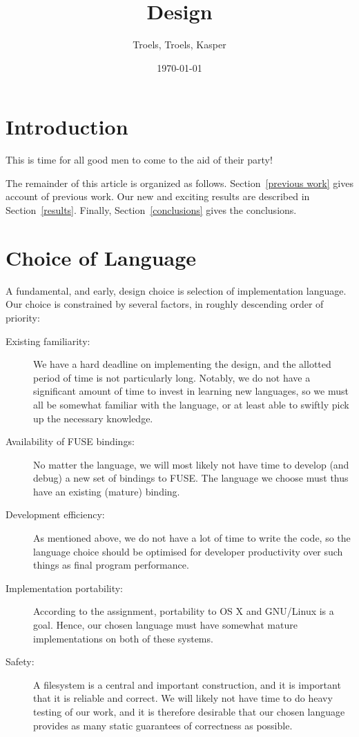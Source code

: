 \documentclass[12pt]{article}
\author{
        Troels, Troels, Kasper
}
\date{\today}
\title{Design}
\begin{document}
\maketitle

\section{Introduction}
This is time for all good men to come to the aid of their party!


The remainder of this article is organized as follows.
Section~\ref{previous work} gives account of previous work.  Our new
and exciting results are described in Section~\ref{results}.  Finally,
Section~\ref{conclusions} gives the conclusions.

\section{Choice of Language}

A fundamental, and early, design choice is selection of implementation
language.  Our choice is constrained by several factors, in roughly
descending order of priority:

\begin{description}
\item[Existing familiarity: ] We have a hard deadline on
  implementing the design, and the allotted period of time is not
  particularly long.  Notably, we do not have a significant amount of
  time to invest in learning new languages, so we must all be somewhat
  familiar with the language, or at least able to swiftly pick up the
  necessary knowledge.
\item[Availability of FUSE bindings: ] No matter the language, we will
  most likely not have time to develop (and debug) a new set of
  bindings to FUSE.  The language we choose must thus have an existing
  (mature) binding.
\item[Development efficiency: ] As mentioned above, we do not have a
  lot of time to write the code, so the language choice should be
  optimised for developer productivity over such things as final
  program performance.
\item[Implementation portability: ] According to the assignment,
  portability to OS X and GNU/Linux is a goal.  Hence, our chosen
  language must have somewhat mature implementations on both of these
  systems.
\item[Safety: ] A filesystem is a central and important construction,
  and it is important that it is reliable and correct.  We will likely
  not have time to do heavy testing of our work, and it is therefore
  desirable that our chosen language provides as many static
  guarantees of correctness as possible.
\end{description}
\end{document}
